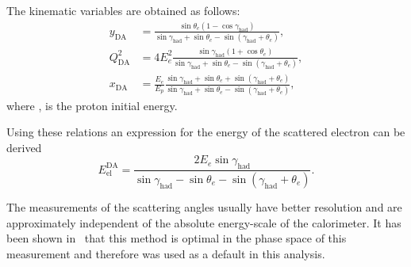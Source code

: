 The kinematic variables are obtained as follows:
\begin{align}
	y_\text{DA}      &= \frac{ \sin \theta_e \left( 1 - \cos \gamma_\text{had} \right)}{ \sin \gamma_\text{had} + \sin \theta_e - \sin \left( \gamma_\text{had} + \theta_e \right) },			\label{eq:yda} \\
	Q^2_\text{DA} &= 4E_e^2\frac{ \sin \gamma_\text{had} \left( 1 + \cos \theta_e \right) }{ \sin \gamma_\text{had} + \sin \theta_e - \sin \left( \gamma_\text{had} + \theta_e \right) },			\label{eq:q2da}							\\
	x_\text{DA}      &= \frac{E_e}{E_p} \frac{\sin \gamma_\text{had} + \sin \theta_e + \sin \left( \gamma_\text{had} + \theta_e \right)}{\sin \gamma_\text{had} + \sin \theta_e - \sin \left( \gamma_\text{had} + \theta_e \right)},			\label{eq:xda}
\end{align}
where \epini, is the proton initial energy.

Using these relations an expression for the energy of the scattered electron can be derived
\begin{equation}
E_\text{el}^\text{DA} = \frac{2E_e \sin \gamma_\text{had}}{\sin \gamma_\text{had} - \sin \theta_e - \sin \left( \gamma_\text{had} + \theta_e \right)}.
\label{eq:eeda}
\end{equation}

 The measurements of the scattering angles usually have better resolution and are approximately independent of the absolute energy-scale of the calorimeter. It has been shown in~\cite{thesis:behr:2010} that this method is optimal in the phase space of this measurement and therefore was used as a default in this analysis.

